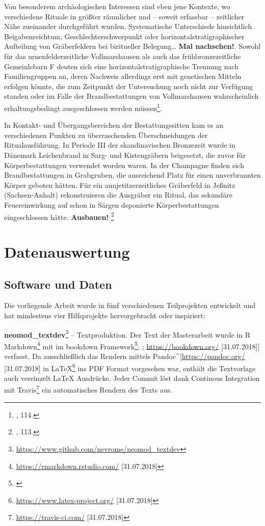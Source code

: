\documentclass[openany,twoside,twocolumn]{book}
\let\rmarkdownfootnote\footnote%
\def\footnote{\protect\rmarkdownfootnote}
\let\pby\printbibliography
\renewcommand{\printbibliography}{}
\begin{document}
Von besonderem archäologischen Interessen sind eben jene Kontexte, wo
verschiedene Rituale in größter räumlicher und -- soweit erfassbar --
zeitlicher Nähe zueinander durchgeführt wurden. Systematische
Unterschiede hinsichtlich Beigabenreichtum, Geschlechterschwerpunkt oder
horizontalstratigraphischer Aufteilung von Gräberfeldern bei biritueller
Belegung\ldots{} \textbf{Mal nachsehen!}. Sowohl für das
urnenfelderzeitliche Vollmarshausen als auch das frühbronzezeitliche
Gemeinlebarn F deuten sich eine horizontalstratigraphische Trennung nach
Familiengruppen an, deren Nachweis allerdings erst mit genetischen
Mitteln erfolgen könnte, die zum Zeitpunkt der Untersuchung noch nicht
zur Verfügung standen oder im Falle der Brandbestattungen von
Vollmarshausen wahrscheinlich erhaltungsbedingt ausgeschlossen werden
müssen\footnote{\textcite{harding_european_2000}, 114.}.

In Kontakt- und Übergangsbereichen der Bestattungssitten kam es an
verschiedenen Punkten zu überraschenden Überschneidungen der
Ritualausführung. In Periode III der skandinavischen Bronzezeit wurde in
Dänemark Leichenbrand in Sarg- und Kistengräbern beigesetzt, die zuvor
für Körperbestattungen verwendet worden waren. In der Champagne finden
sich Brandbestattungen in Grabgruben, die ausreichend Platz für einen
unverbrannten Körper geboten hätten. Für ein aunjetitzerzeitliches
Gräberfeld in Jeßnitz (Sachsen-Anhalt) rekonstruieren die Ausgräber ein
Ritual, das sekundäre Feuereinwirkung auf schon in Särgen deponierte
Körperbestattungen eingeschlossen hätte. \textbf{Ausbauen!} \footnote{\textcite{harding_european_2000},
  113.}

\newpage
\pby[title={Literatur},segment=\therefsegment,heading=subbibintoc]

\hypertarget{data-analysis}{%
\chapter{Datenauswertung}\label{data-analysis}}

\hypertarget{software-und-daten}{%
\section{Software und Daten}\label{software-und-daten}}

Die vorliegende Arbeit wurde in fünf verschiedenen Teilprojekten
entwickelt und hat mindestens vier Hilfsprojekte hervorgebracht oder
inspiriert:

\textbf{neomod\_textdev}\footnote{\url{https://www.github.com/nevrome/neomod_textdev}}
-- Textproduktion. Der Text der Masterarbeit wurde in R
Markdown\footnote{\url{https://rmarkdown.rstudio.com/} {[}31.07.2018{]}}
mit im bookdown Framework\footnote{\textcite{xie_bookdown_2016}};
\autocite{xie_bookdown_2018}; \url{https://bookdown.org/}
{[}31.07.2018{]}{]} verfasst. Da ausschließlich das Rendern mittels
Pandoc\^{}{[}\url{https://pandoc.org/} {[}31.07.2018{]} in
LaTeX\footnote{\url{https://www.latex-project.org/} {[}31.07.2018{]}}
ins PDF Format vorgesehen war, enthält die Textvorlage auch vereinzelt
LaTeX Ausdrücke. Jeder Commit löst dank Continous Integration mit
Travis\footnote{\url{https://travis-ci.com/} {[}31.07.2018{]}} ein
automatisches Rendern des Texts aus.
\end{document}
